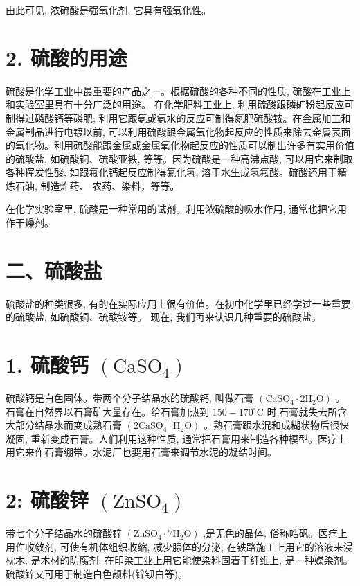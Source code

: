 \documentclass[10pt]{article}
\begin{document}
由此可见, 浓硫酸是强氧化剂, 它具有强氧化性。

\section*{2. 硫酸的用途}

硫酸是化学工业中最重要的产品之一。根据硫酸的各种不同的性质, 硫酸在工业上和实验室里具有十分广泛的用途。 在化学肥料工业上, 利用硫酸跟磷矿粉起反应可制得过磷酸钙等磷肥; 利用它跟氨或氨水的反应可制得氮肥硫酸铵。在金属加工和金属制品进行电镀以前, 可以利用硫酸跟金属氧化物起反应的性质来除去金属表面的氧化物。利用硫酸能跟金属或金属氧化物起反应的性质可以制出许多有实用价值的硫酸盐, 如硫酸铜、硫酸亚铁, 等等。因为硫酸是一种高沸点酸, 可以用它来制取各种挥发性酸, 如跟氟化钙起反应制得氟化氢, 溶于水生成氢氟酸。硫酸还用于精炼石油, 制造炸药、 农药、染料，等等。

在化学实验室里, 硫酸是一种常用的试剂。利用浓硫酸的吸水作用, 通常也把它用作干燥剂。

\section*{二、硫酸盐}

硫酸盐的种类很多, 有的在实际应用上很有价值。在初中化学里已经学过一些重要的硫酸盐, 如硫酸铜、硫酸铵等。 现在, 我们再来认识几种重要的硫酸盐。

\section*{1. 硫酸钙 \(\left( {\mathrm{{CaSO}}}_{4}\right)\)}

硫酸钙是白色固体。带两个分子结晶水的硫酸钙, 叫做石膏 \(\left( {{\mathrm{{CaSO}}}_{4} \cdot 2{\mathrm{H}}_{2}\mathrm{O}}\right)\) 。石膏在自然界以石膏矿大量存在。给石膏加热到 \({150} - {170}^{ \circ }\mathrm{C}\) 时,石膏就失去所含大部分结晶水而变成熟石膏 \(\left( {2{\mathrm{{CaSO}}}_{4} \cdot {\mathrm{H}}_{2}\mathrm{O}}\right)\) 。熟石膏跟水混和成糊状物后很快凝固, 重新变成石膏。人们利用这种性质, 通常把石膏用来制造各种模型。医疗上用它来作石膏绷带。水泥厂也要用石膏来调节水泥的凝结时间。

\section*{2: 硫酸锌 \(\left( {\mathrm{{ZnSO}}}_{4}\right)\)}

带七个分子结晶水的硫酸锌 \(\left( {{\mathrm{{ZnSO}}}_{4} \cdot 7{\mathrm{H}}_{2}\mathrm{O}}\right)\) ,是无色的晶体, 俗称皓矾。医疗上用作收敛剂, 可使有机体组织收缩, 减少腺体的分泌; 在铁路施工上用它的溶液来浸枕木, 是木材的防腐剂; 在印染工业上用它能使染料固着于纤维上, 是一种媒染剂。硫酸锌又可用于制造白色颜料(锌钡白等)。
\end{document}
